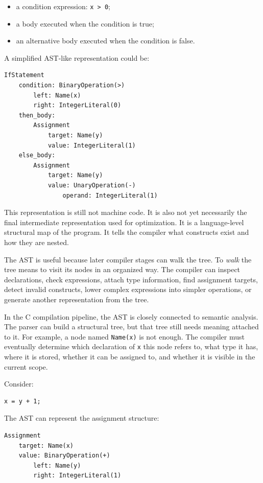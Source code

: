 \begin{itemize}
    \item a condition expression: \texttt{x > 0};
    \item a body executed when the condition is true;
    \item an alternative body executed when the condition is false.
\end{itemize}

A simplified AST-like representation could be:

\begin{verbatim}
IfStatement
    condition: BinaryOperation(>)
        left: Name(x)
        right: IntegerLiteral(0)
    then_body:
        Assignment
            target: Name(y)
            value: IntegerLiteral(1)
    else_body:
        Assignment
            target: Name(y)
            value: UnaryOperation(-)
                operand: IntegerLiteral(1)
\end{verbatim}

This representation is still not machine code. It is also not yet necessarily the final intermediate representation used for optimization. It is a language-level structural map of the program. It tells the compiler what constructs exist and how they are nested.

The AST is useful because later compiler stages can walk the tree. To \emph{walk} the tree means to visit its nodes in an organized way. The compiler can inspect declarations, check expressions, attach type information, find assignment targets, detect invalid constructs, lower complex expressions into simpler operations, or generate another representation from the tree.

In the C compilation pipeline, the AST is closely connected to semantic analysis. The parser can build a structural tree, but that tree still needs meaning attached to it. For example, a node named \texttt{Name(x)} is not enough. The compiler must eventually determine which declaration of \texttt{x} this node refers to, what type it has, where it is stored, whether it can be assigned to, and whether it is visible in the current scope.

Consider:

\begin{verbatim}
x = y + 1;
\end{verbatim}

The AST can represent the assignment structure:

\begin{verbatim}
Assignment
    target: Name(x)
    value: BinaryOperation(+)
        left: Name(y)
        right: IntegerLiteral(1)
\end{verbatim}

